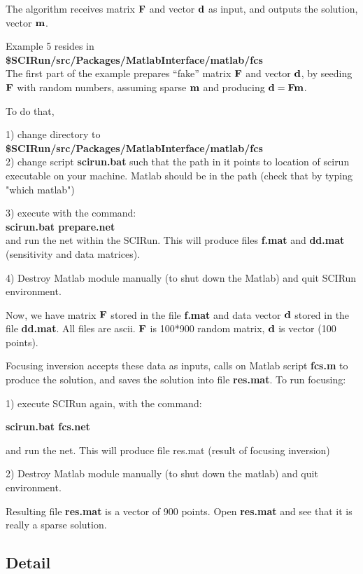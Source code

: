 The algorithm receives matrix ${\bf F}$ and vector ${\bf d}$
as input, and outputs the solution, vector ${\bf m}$.

Example 5 resides in \\
{\bf \$SCIRun/src/Packages/MatlabInterface/matlab/fcs } \\

The first part of the example prepares ``fake'' matrix ${\bf F}$ and 
vector ${\bf d}$, by seeding ${\bf F}$ with random numbers,
assuming sparse ${\bf m}$ and producing ${\bf d}={\bf F} {\bf m}$.

To do that, 

1) change directory to \\
{\bf \$SCIRun/src/Packages/MatlabInterface/matlab/fcs } \\

2) change script {\bf scirun.bat} such that the path in
   it points to location of scirun executable
   on your machine. Matlab should be in the
   path (check that by typing "which matlab")

3) execute \sr{} with the command:\\
   {\bf scirun.bat prepare.net }\\
   and run the net within the SCIRun.
   This will produce files {\bf f.mat} and {\bf dd.mat}
   (sensitivity and data matrices).

4) Destroy Matlab module manually
   (to shut down the Matlab)
   and quit SCIRun environment.

Now, we have matrix ${\bf F}$ stored in the file {\bf f.mat}
and data vector ${\bf d}$ stored in the file {\bf dd.mat}.
All files are ascii. ${\bf F}$ is 100*900 random
matrix, ${\bf d}$ is vector (100 points). 

Focusing inversion accepts these data as inputs, calls
on Matlab script {\bf fcs.m} to produce the solution,
and saves the solution into file {\bf res.mat}.
To run focusing:

1) execute SCIRun again, with the command:

   {\bf scirun.bat fcs.net}

   and run the net. This will produce file
   res.mat (result of focusing inversion)

2) Destroy Matlab module manually
   (to shut down the matlab)
   and quit \sr{} environment.

Resulting file {\bf res.mat} 
is  a vector of 900 points. 
Open {\bf res.mat}
and see that it is really a
sparse solution.


\subsection{Detail} \indent

